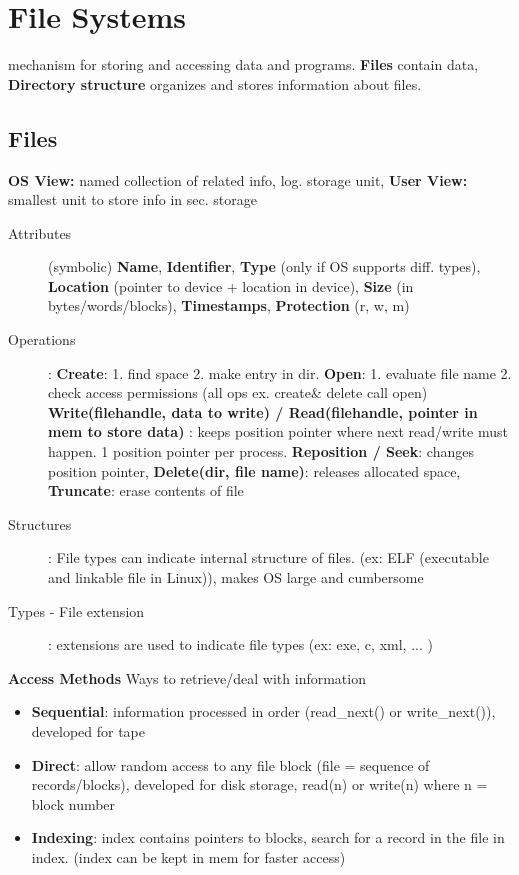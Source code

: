 \section*{File Systems}
mechanism for storing and accessing data and programs. \textbf{Files} contain data, \textbf{Directory structure} organizes and stores information about files.

\subsection*{Files}
\textbf{OS View:}  named collection of related info, log. storage unit, \textbf{User View:}  smallest unit to store info in sec. storage
\begin{description}
    \item[Attributes](symbolic) \textbf{Name}, \textbf{Identifier},  \textbf{Type} (only if OS supports diff. types), \textbf{Location} (pointer to device + location in device), \textbf{Size} (in bytes/words/blocks), \textbf{Timestamps}, \textbf{Protection} (r, w, m)
    \item[Operations]: \textbf{Create}: 1. find space 2. make entry in dir. \textbf{Open}: 1. evaluate file name 2. check access permissions (all ops ex. create\& delete call open) \textbf{Write(filehandle, data to write) / Read(filehandle, pointer in mem to store data) }: keeps position pointer where next read/write must happen. 1 position pointer per process. \textbf{Reposition / Seek}: changes position pointer, \textbf{Delete(dir, file name)}: releases allocated space, \textbf{Truncate}: erase contents of file
    \item[Structures]: File types can indicate internal structure of files. (ex: ELF (executable and linkable file in Linux)), makes OS large and cumbersome
    \item[Types - File extension]: extensions are used to indicate file types (ex: exe, c, xml, ... )
\end{description}

\textbf{Access Methods} Ways to retrieve/deal with information
\begin{itemize}
    \item \textbf{Sequential}: information processed in order (read\_next() or write\_next()), developed for tape
    \item \textbf{Direct}: allow random access to any file block (file = sequence of records/blocks), developed for disk storage, read(n) or write(n) where n = block number
    \item \textbf{Indexing}: index contains pointers to blocks, search for a record in the file in index. (index can be kept in mem for faster access)
\end{itemize}

